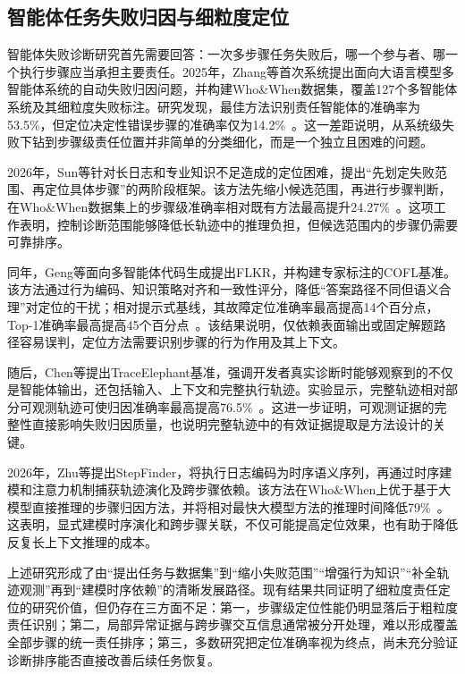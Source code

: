 \subsection{智能体任务失败归因与细粒度定位}

智能体失败诊断研究首先需要回答：一次多步骤任务失败后，哪一个参与者、哪一个执行步骤应当承担主要责任。2025年，Zhang等首次系统提出面向大语言模型多智能体系统的自动失败归因问题，并构建Who\&When数据集，覆盖127个多智能体系统及其细粒度失败标注。研究发现，最佳方法识别责任智能体的准确率为53.5\%，但定位决定性错误步骤的准确率仅为14.2\%~\cite{zhang2025whowhen}。这一差距说明，从系统级失败下钻到步骤级责任位置并非简单的分类细化，而是一个独立且困难的问题。

2026年，Sun等针对长日志和专业知识不足造成的定位困难，提出“先划定失败范围、再定位具体步骤”的两阶段框架。该方法先缩小候选范围，再进行步骤判断，在Who\&When数据集上的步骤级准确率相对既有方法最高提升24.27\%~\cite{sun2026scope}。这项工作表明，控制诊断范围能够降低长轨迹中的推理负担，但候选范围内的步骤仍需要可靠排序。

同年，Geng等面向多智能体代码生成提出FLKR，并构建专家标注的COFL基准。该方法通过行为编码、知识策略对齐和一致性评分，降低“答案路径不同但语义合理”对定位的干扰；相对提示式基线，其故障定位准确率最高提高14个百分点，Top-1准确率最高提高45个百分点~\cite{geng2026flkr}。该结果说明，仅依赖表面输出或固定解题路径容易误判，定位方法需要识别步骤的行为作用及其上下文。

随后，Chen等提出TraceElephant基准，强调开发者真实诊断时能够观察到的不仅是智能体输出，还包括输入、上下文和完整执行轨迹。实验显示，完整轨迹相对部分可观测轨迹可使归因准确率最高提高76.5\%~\cite{chen2026traceelephant}。这进一步证明，可观测证据的完整性直接影响失败归因质量，也说明完整轨迹中的有效证据提取是方法设计的关键。

2026年，Zhu等提出StepFinder，将执行日志编码为时序语义序列，再通过时序建模和注意力机制捕获轨迹演化及跨步骤依赖。该方法在Who\&When上优于基于大模型直接推理的步骤归因方法，并将相对最快大模型方法的推理时间降低79\%~\cite{zhu2026stepfinder}。这表明，显式建模时序演化和跨步骤关联，不仅可能提高定位效果，也有助于降低反复长上下文推理的成本。

上述研究形成了由“提出任务与数据集”到“缩小失败范围”“增强行为知识”“补全轨迹观测”再到“建模时序依赖”的清晰发展路径。现有结果共同证明了细粒度责任定位的研究价值，但仍存在三方面不足：第一，步骤级定位性能仍明显落后于粗粒度责任识别；第二，局部异常证据与跨步骤交互信息通常被分开处理，难以形成覆盖全部步骤的统一责任排序；第三，多数研究把定位准确率视为终点，尚未充分验证诊断排序能否直接改善后续任务恢复。

